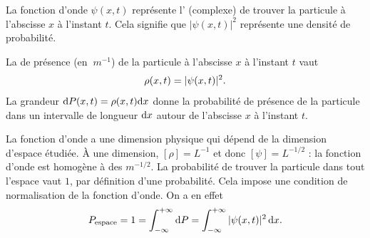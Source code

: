 \documentclass[12pt,fancy]{cours}
\begin{document}
%

%
 La fonction d'onde $\psi(x,t)$ représente l' (complexe) de trouver la particule à l'abscisse $x$ à l'instant $t$. Cela signifie que $|\psi(x,t)|^2$ représente une densité de probabilité.
 \begin{prop}\label{prop:}

   La  de présence (en $\SI{}{m^{-1}}$) de la particule à l’abscisse $x$ à l'instant $t$ vaut
   \begin{equation*}
     \rho(x,t)=|\psi(x,t)|^2.
   \end{equation*}
   La grandeur $\mathrm{d} P(x,t)=\rho(x,t)\mathrm{d} x$
donne la probabilité de présence de la particule dans un intervalle de longueur $\mathrm{d} x$ autour de l’abscisse $x$ à l’instant $t$.
 \end{prop}
La fonction d'onde a une dimension physique qui dépend de la dimension d'espace étudiée. À une dimension, $[\rho] = L^{-1}$  et donc $[\psi] = L^{-1/2}$ : la fonction d’onde est homogène à des $m^{-1/2}$.
La probabilité de trouver la particule dans tout l'espace vaut $1$, par définition d'une probabilité. Cela impose une condition de normalisation de la fonction d'onde. On a en effet 
\begin{equation}
  P_{\rm espace} = 1 = \int_{-\infty}^{+\infty} \mathrm{d} P = \int_{-\infty}^{+\infty}|\psi(x,t)|^2\,\mathrm{d} x.
\end{equation}
\end{document}
